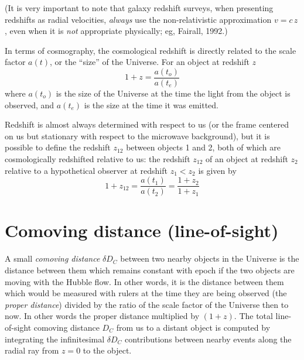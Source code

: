 (It is very important to note that galaxy redshift surveys, when
presenting redshifts as radial velocities, {\em always\/} use the
non-relativistic approximation $v=c\,z$, even when it is {\em not\/}
appropriate physically; eg, Fairall, 1992.)

In terms of cosmography, the cosmological redshift is directly related
to the scale factor $a(t)$, or the ``size'' of the Universe.  For an
object at redshift $z$
\begin{equation}
1+z = \frac{a(t_o)}{a(t_e)}
\end{equation}
where $a(t_o)$ is the size of the Universe at the time the light from
the object is observed, and $a(t_e)$ is the size at the time it was
emitted.

Redshift is almost always determined with respect to us (or the frame
centered on us but stationary with respect to the microwave
background), but it is possible to define the redshift $z_{12}$
between objects 1 and 2, both of which are cosmologically redshifted
relative to us: the redshift $z_{12}$ of an object at redshift $z_2$
relative to a hypothetical observer at redshift $z_1<z_2$ is given by
\begin{equation}
1+z_{12} = \frac{a(t_1)}{a(t_2)} = \frac{1+z_2}{1+z_1}
\end{equation}


\section{Comoving distance (line-of-sight)}

A small {\em comoving distance\/} $\delta D_C$ between two nearby
objects in the Universe is the distance between them which remains
constant with epoch if the two objects are moving with the Hubble
flow.  In other words, it is the distance between them which would be
measured with rulers at the time they are being observed (the {\em
proper distance}) divided by the ratio of the scale factor of the
Universe then to now.  In other words the proper distance multiplied
by $(1+z)$.  The total line-of-sight comoving distance $D_C$ from us
to a distant object is computed by integrating the infinitesimal
$\delta D_C$ contributions between nearby events along the radial ray
from $z=0$ to the object.

